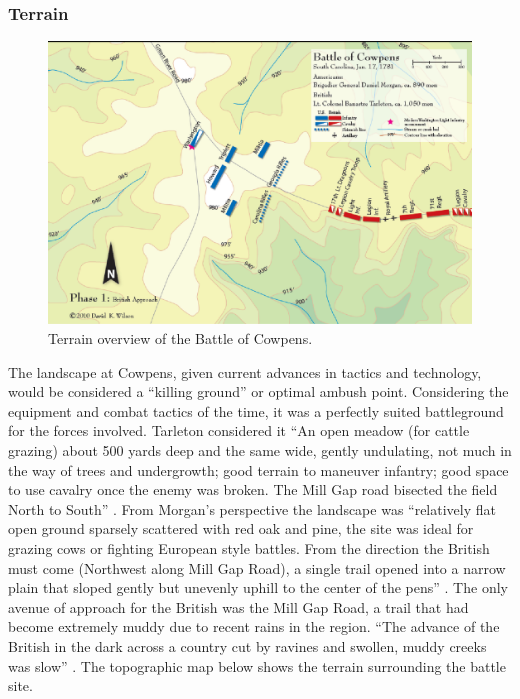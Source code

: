 \subsubsection{Terrain}

\begin{figure}[h]
 	\singlespacing
 	\begin{center}
 	\includegraphics[width=6in]{gfx/futch1}
 	\end{center}
	\caption{Terrain overview of the Battle of Cowpens. \cite{wilson_blogmap}}
 	\label{terrain1}
\end{figure}

The landscape at Cowpens, given current advances in tactics and technology,
would be considered a ``killing ground'' or optimal ambush point.  Considering
the equipment and combat tactics of the time, it was a perfectly suited
battleground for the forces involved.  Tarleton considered it ``An open meadow
(for cattle grazing) about 500 yards deep and the same wide, gently undulating,
not much in the way of trees and undergrowth; good terrain to maneuver
infantry; good space to use cavalry once the enemy was broken.  The Mill Gap
road bisected the field North to South'' \cite[326]{stephenson_patriot_2007}.
From Morgan's perspective the landscape was ``relatively flat open ground
sparsely scattered with red oak and pine, the site was ideal for grazing cows
or fighting European style battles.  From the direction the British must come
(Northwest along Mill Gap Road), a single trail opened into a narrow plain that
sloped gently but unevenly uphill to the center of the pens''
\cite[45]{moncure_cowpens_1996}.  The only avenue of approach for the British
was the Mill Gap Road, a trail that had become extremely muddy due to recent
rains in the region. ``The advance of the British in the dark across a country
cut by ravines and swollen, muddy creeks was slow''
\cite[126]{lumpkin_savannah_1981}.  The topographic map below
\cite{wilson_blogmap} shows the terrain surrounding the battle site.  

